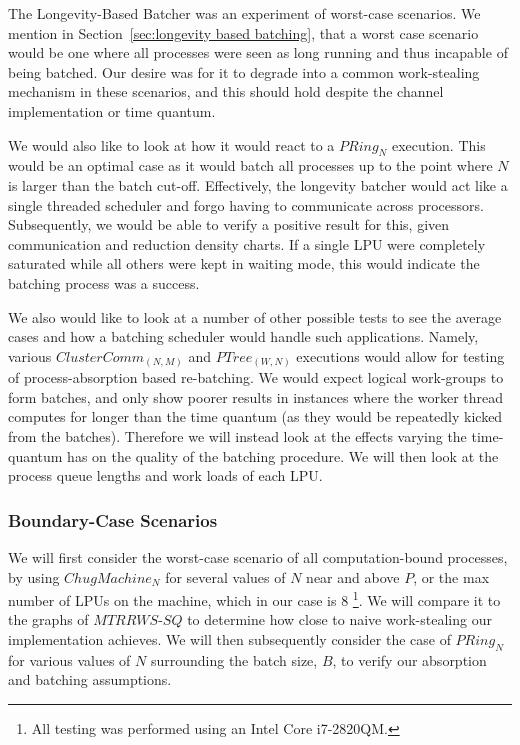 The Longevity-Based Batcher was an experiment of worst-case scenarios. We
mention in Section~\ref{sec:longevity based batching}, that a worst case 
scenario would be one where all processes were seen as long running and 
thus incapable of being batched. Our desire was for it to degrade into 
a common work-stealing mechanism in these scenarios, and this should hold despite 
the channel implementation or time quantum.

We would also like to look at how it would react to a $PRing_N$ execution. This
would be an optimal case as it would batch all processes up to the point where
$N$ is larger than the batch cut-off. Effectively, the longevity batcher would
act like a single threaded scheduler and forgo having to communicate across
processors. Subsequently, we would be able to verify a positive result for this, given
communication and reduction density charts. If a single LPU were completely
saturated while all others were kept in waiting mode, this would indicate the
batching process was a success.

We also would like to look at a number of other possible tests to see the
average cases and how a batching scheduler would handle such applications.
Namely, various $ClusterComm_{(N,M)}$ and $PTree_{(W,N)}$ executions would allow 
for testing of process-absorption based re-batching. We would expect logical
work-groups to form batches, and only show poorer results in instances where
the worker thread computes for longer than the time quantum (as they would be
repeatedly kicked from the batches). Therefore we will instead look at the
effects varying the time-quantum has on the quality of the batching procedure.
We will then look at the process queue lengths and work loads of each LPU.

\subsubsection{Boundary-Case Scenarios}\label{sec:results-longbatcher-worstcase}

We will first consider the worst-case scenario of all computation-bound processes, by 
using $ChugMachine_N$ for several values of $N$ near and 
above $P$, or the max number of LPUs on the machine, which in our case 
is $8$ \footnote{All testing was performed using an Intel Core i7-2820QM.}.  We will 
compare it to the graphs of $MTRRWS$-$SQ$ to determine how close to naive
work-stealing our implementation achieves. We will then subsequently consider
the case of $PRing_N$ for various values of $N$ surrounding the batch size, $B$,
to verify our absorption and batching assumptions.

